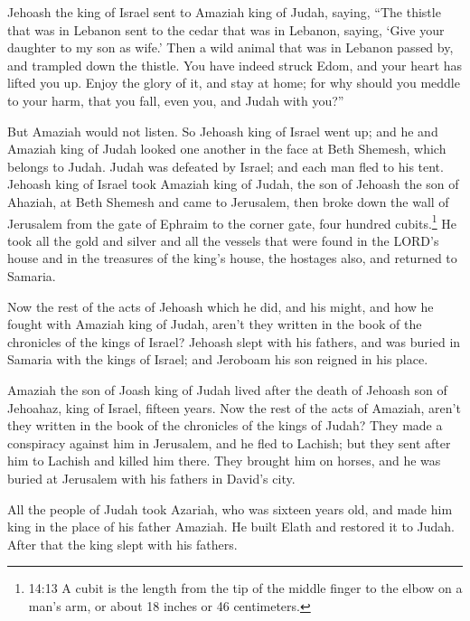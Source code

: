 \myverse{}Jehoash the king of Israel sent to Amaziah king of Judah, saying,
“The thistle that was in Lebanon sent to the cedar that was in Lebanon, saying, ‘Give your daughter to
my son as wife.’ Then a wild animal that was in Lebanon passed by, and trampled down the thistle.
\myverse{}You have indeed struck Edom, and your heart has lifted you up. Enjoy the
glory of it, and stay at home; for why should you meddle to your harm, that you fall, even you, and Judah
with you?”

\myverse{}But Amaziah would not listen. So Jehoash king of Israel went
up; and he and Amaziah king of Judah looked one another in the face at Beth Shemesh, which belongs to
Judah.
\myverse{}Judah was defeated by Israel; and each man fled to his tent.
\myverse{}Jehoash king of Israel took Amaziah king of Judah, the son of Jehoash the
son of Ahaziah, at Beth Shemesh and came to Jerusalem, then broke down the wall of Jerusalem from the
gate of Ephraim to the corner gate, four hundred cubits.\footnote{14:13 A cubit is the length from the tip of the middle finger to the elbow on a man’s arm, or about
	18 inches or 46 centimeters.}
\myverse{}He took all the gold and silver and all the vessels that were found in the
LORD’s house and in the treasures of the king’s house, the hostages also, and returned to Samaria.

\myverse{}Now the rest of the acts of Jehoash which he did, and his might,
and how he fought with Amaziah king of Judah, aren’t they written in the book of the chronicles of the
kings of Israel?
\myverse{}Jehoash slept with his fathers, and was buried in Samaria with the kings
of Israel; and Jeroboam his son reigned in his place.

\myverse{}Amaziah the son of Joash king of Judah lived after the death
of Jehoash son of Jehoahaz, king of Israel, fifteen years.
\myverse{}Now the rest of the acts of Amaziah, aren’t they written in the book of the
chronicles of the kings of Judah?
\myverse{}They made a conspiracy against him in Jerusalem, and he fled to Lachish;
but they sent after him to Lachish and killed him there.
\myverse{}They brought him on horses, and he was buried at Jerusalem with his fathers
in David’s city.

\myverse{}All the people of Judah took Azariah, who was sixteen years
old, and made him king in the place of his father Amaziah.
\myverse{}He built Elath and restored it to Judah. After that the king slept with his
fathers.

